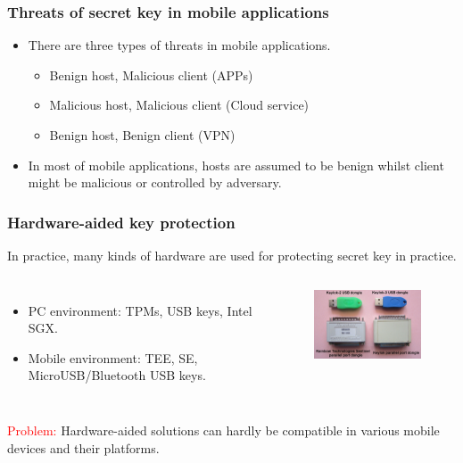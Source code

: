 \documentclass[aspectratio=169,xcolor=dvipsnames]{beamer}
\begin{document}
\frame
{
\frametitle{Threats of secret key in mobile applications}
\begin{itemize}
 \setlength{\itemsep}{12pt}
\item There are three types of threats in mobile applications.
\begin{itemize}
\setlength{\itemsep}{12pt}
\item Benign host, Malicious client (APPs)
\item Malicious host, Malicious client (Cloud service)
\item Benign host, Benign client (VPN)
\end{itemize}
\setlength{\itemsep}{12pt}
\item In most of mobile applications, hosts are assumed to be benign whilst client might be malicious or controlled by adversary.
\end{itemize}
}


\frame
{
\frametitle{Hardware-aided key protection}
In practice, many kinds of hardware are used for protecting secret key in practice.
\begin{columns}[c]
\begin{itemize}
\setlength{\itemsep}{12pt}
\item PC environment: TPMs, USB keys, Intel SGX.
\item Mobile environment: TEE, SE, MicroUSB/Bluetooth USB keys.
\end{itemize}
\begin{figure}[htbp]
\centering
  \includegraphics[width=4.8cm]{./pics/dongles.jpg}
\end{figure}
\end{columns}


\textcolor{red}{Problem:} Hardware-aided solutions can hardly be compatible in various mobile devices and their platforms.
}
\end{document}
